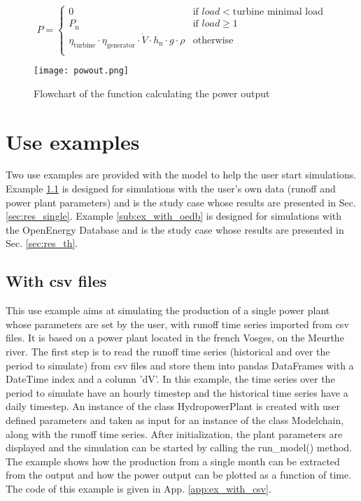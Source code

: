 \begin{equation}
  \label{eq_pow}
P= \left\{
    \begin{array}{ll}
	0 & \mbox{if } load < \mbox{turbine minimal load}\\
        P_\mathrm{n} & \mbox{if } load\geq 1 \\
        \eta_\mathrm{turbine} \cdot \eta_\mathrm{generator} \cdot \dot{V} \cdot h_\mathrm{n} \cdot g \cdot \rho & \mbox{otherwise}\\
    \end{array}
\right.
\end{equation}

\begin{figure}[H]
\centering
\texttt{[image: powout.png]}
\caption{Flowchart of the function calculating the power output}
\label{powout}
\end{figure}



\section{Use examples}
Two use examples are provided with the model to help the user start simulations. Example \ref{sub:ex_with_csv} is designed for simulations with the user's own data (runoff and power plant parameters) and is the study case whose results are presented in Sec. \ref{sec:res_single}. Example \ref{sub:ex_with_oedb} is designed for simulations with the OpenEnergy Database and is the study case whose results are presented in Sec. \ref{sec:res_th}.

\subsection{With csv files}
\label{sub:ex_with_csv}

This use example aims at simulating the production of a single power plant whose parameters are set by the user, with runoff time series imported from csv files. It is based on a power plant located in the french Vosges, on the Meurthe river. \newline
The first step is to read the runoff time series (historical and over the period to simulate) from csv files and store them into pandas DataFrames with a DateTime index and a column 'dV'.
In this example, the time series over the period to simulate have an hourly timestep and the historical time series have a daily timestep. An instance of the class HydropowerPlant is created with user defined parameters and taken as input for an instance of the class Modelchain, along with the runoff time series. \newline
After initialization, the plant parameters are displayed and the simulation can be started by calling the run{\_}model() method. The example shows how the production from a single month can be extracted from the output and how the power output can be plotted as a function of time. The code of this example is given in App. \ref{app:ex_with_csv}.

